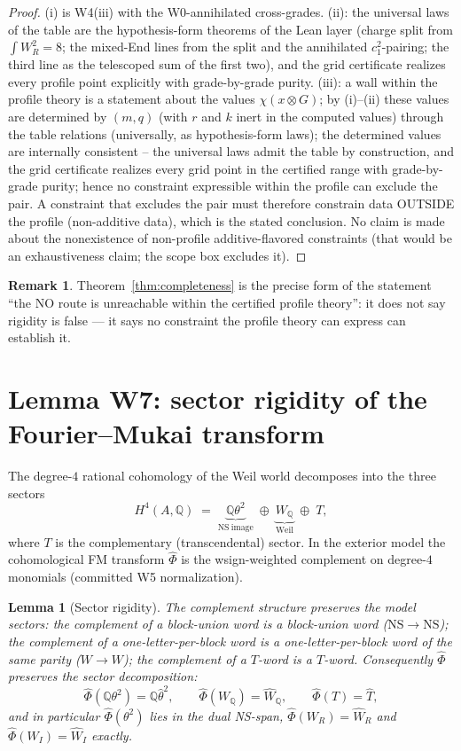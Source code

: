 \documentclass[11pt]{article}
\newtheorem{lemma}[theorem]{Lemma}
\theoremstyle{definition}
\newtheorem{remark}[theorem]{Remark}
\newcommand{\Q}{\mathbb{Q}}
\newcommand{\WQ}{W_{\Q}}
\newcommand{\FMc}{\widehat\Phi}
\begin{document}
\begin{proof}
(i) is W4(iii) with the W0-annihilated cross-grades. (ii): the universal laws
of the table are the hypothesis-form theorems of the Lean layer
(charge split from $\int W_R^2=8$; the mixed-End lines from the split and the
annihilated $c_1^2$-pairing; the third line as the telescoped sum of the first
two), and the grid certificate realizes every profile point explicitly with
grade-by-grade purity. (iii): a wall within the profile theory is a statement about
the values $\chi(x\otimes G)$; by (i)--(ii) these values are determined by
$(m,q)$ (with $r$ and $k$ inert in the computed values) through the table relations (universally, as hypothesis-form
laws); the determined values are internally consistent -- the universal laws
admit the table by construction, and the grid certificate realizes every
grid point in the certified range with grade-by-grade purity; hence no
constraint expressible within the profile can exclude the pair. A constraint
that excludes the pair must therefore constrain data OUTSIDE the profile
(non-additive data), which is the stated conclusion. No claim is made about
the nonexistence of non-profile additive-flavored constraints (that would be
an exhaustiveness claim; the scope box excludes it).
\end{proof}

\begin{remark}
Theorem~\ref{thm:completeness} is the precise form of the statement ``the NO
route is unreachable within the certified profile theory'': it does not say
rigidity is false --- it says no constraint the profile theory can express
can establish it.
\end{remark}

\section{Lemma W7: sector rigidity of the Fourier--Mukai transform}\label{sec:w7}

The degree-$4$ rational cohomology of the Weil world decomposes into the three
sectors
\[
H^4(A,\Q)\;=\;\underbrace{\Q\theta^2}_{\mathrm{NS\ image}}\;\oplus\;
\underbrace{\WQ}_{\mathrm{Weil}}\;\oplus\;T,
\]
where $T$ is the complementary (transcendental) sector. In the exterior model
the cohomological FM transform $\FMc$ is the wsign-weighted complement on
degree-$4$ monomials (committed W5 normalization).

\begin{lemma}[Sector rigidity]\label{lem:w7}
The complement structure preserves the model sectors: the complement of a
block-union word is a block-union word ($\mathrm{NS}\to\mathrm{NS}$); the
complement of a one-letter-per-block word is a one-letter-per-block word of
the same parity ($W\to W$); the complement of a $T$-word is a $T$-word.
Consequently $\FMc$ preserves the sector decomposition:
\[
\FMc(\Q\theta^2)=\Q\widehat\theta^2,\qquad
\FMc(\WQ)=\widehat\WQ,\qquad \FMc(T)=\widehat T,
\]
and in particular $\FMc(\theta^2)$ lies in the dual NS-span,
$\FMc(W_R)=\widehat W_R$ and $\FMc(W_I)=\widehat W_I$ exactly.
\end{lemma}
\end{document}
